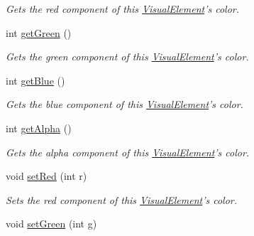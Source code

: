 \begin{DoxyCompactItemize}
\begin{DoxyCompactList}\small\item\em Gets the red component of this \hyperlink{struct_picto_1_1_visual_element}{Visual\-Element}'s color. \end{DoxyCompactList}\item 
\hypertarget{struct_picto_1_1_visual_element_add6251ffa70e382066dfb832e5a58fd8}{int \hyperlink{struct_picto_1_1_visual_element_add6251ffa70e382066dfb832e5a58fd8}{get\-Green} ()}\label{struct_picto_1_1_visual_element_add6251ffa70e382066dfb832e5a58fd8}

\begin{DoxyCompactList}\small\item\em Gets the green component of this \hyperlink{struct_picto_1_1_visual_element}{Visual\-Element}'s color. \end{DoxyCompactList}\item 
\hypertarget{struct_picto_1_1_visual_element_a1ba044f24cd5b69dbaede9301e8f0274}{int \hyperlink{struct_picto_1_1_visual_element_a1ba044f24cd5b69dbaede9301e8f0274}{get\-Blue} ()}\label{struct_picto_1_1_visual_element_a1ba044f24cd5b69dbaede9301e8f0274}

\begin{DoxyCompactList}\small\item\em Gets the blue component of this \hyperlink{struct_picto_1_1_visual_element}{Visual\-Element}'s color. \end{DoxyCompactList}\item 
\hypertarget{struct_picto_1_1_visual_element_ad0f32ee1bedf44b213f24b55580e20a2}{int \hyperlink{struct_picto_1_1_visual_element_ad0f32ee1bedf44b213f24b55580e20a2}{get\-Alpha} ()}\label{struct_picto_1_1_visual_element_ad0f32ee1bedf44b213f24b55580e20a2}

\begin{DoxyCompactList}\small\item\em Gets the alpha component of this \hyperlink{struct_picto_1_1_visual_element}{Visual\-Element}'s color. \end{DoxyCompactList}\item 
\hypertarget{struct_picto_1_1_visual_element_abf80f742b46307d195b1f18e032613ac}{void \hyperlink{struct_picto_1_1_visual_element_abf80f742b46307d195b1f18e032613ac}{set\-Red} (int r)}\label{struct_picto_1_1_visual_element_abf80f742b46307d195b1f18e032613ac}

\begin{DoxyCompactList}\small\item\em Sets the red component of this \hyperlink{struct_picto_1_1_visual_element}{Visual\-Element}'s color. \end{DoxyCompactList}\item 
\hypertarget{struct_picto_1_1_visual_element_ad79c91edc8009d5ec62846bb647e8e07}{void \hyperlink{struct_picto_1_1_visual_element_ad79c91edc8009d5ec62846bb647e8e07}{set\-Green} (int g)}\label{struct_picto_1_1_visual_element_ad79c91edc8009d5ec62846bb647e8e07}


\end{DoxyCompactItemize}
